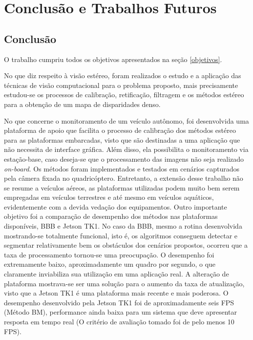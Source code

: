 \chapter{Conclusão e Trabalhos Futuros}
\label{Conclusao}

\section{Conclusão}
O trabalho cumpriu todos os objetivos apresentados na seção \ref{objetivos}. 

No que diz respeito à visão estéreo, foram realizados o estudo e a aplicação das técnicas de visão computacional para o problema proposto, mais precisamente estudou-se os processos de calibração, retificação, filtragem e os métodos estéreo para a obtenção de um mapa de disparidades denso. 

No que concerne o monitoramento de um veículo autônomo, foi desenvolvida uma plataforma de apoio que facilita o processo de calibração dos métodos estéreo para as plataformas embarcadas, visto que são destinadas a uma aplicação que não necessita de interface gráfica. Além disso, ela possibilita o monitoramento via estação-base, caso deseja-se que o processamento das imagens não seja realizado \textit{on-board}. Os métodos foram implementados e testados em cenários capturados pela câmera fixada no quadricóptero. Entretanto, a extensão desse trabalho não se resume a veículos aéreos, as plataformas utilizadas podem muito bem serem empregadas em veículos terrestres e até mesmo em veículos aquáticos, evidentemente com a devida vedação dos equipamentos. Outro importante objetivo foi a comparação de desempenho dos métodos nas plataformas disponíveis, BBB e Jetson TK1. No caso da BBB, mesmo a rotina desenvolvida mostrando-se totalmente funcional, isto é, os algoritmos conseguem detectar e segmentar relativamente bem os obstáculos dos cenários propostos, ocorreu que a taxa de processamento tornou-se uma preocupação. O desempenho foi extremamente baixo, aproximadamente um quadro por segundo, o que claramente inviabiliza sua utilização em uma aplicação real. A alteração de plataforma mostrava-se ser uma solução para o aumento da taxa de atualização, visto que a Jetson TK1 é uma plataforma mais recente e mais poderosa. O desempenho desenvolvido pela Jetson TK1 foi de aproximadamente seis FPS (Método BM), performance ainda baixa para um sistema que deve apresentar resposta em tempo real (O critério de avaliação tomado foi de pelo menos 10 FPS).

